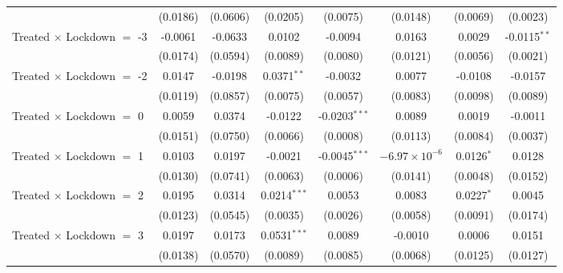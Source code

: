 \begin{tabular}{lccccccc}
                                     & (0.0186)      & (0.0606)      & (0.0205)        & (0.0075)        & (0.0148)               & (0.0069)      & (0.0023)\\   
   Treated $\times$ Lockdown $=$ -3  & -0.0061       & -0.0633       & 0.0102          & -0.0094         & 0.0163                 & 0.0029        & -0.0115$^{**}$\\   
                                     & (0.0174)      & (0.0594)      & (0.0089)        & (0.0080)        & (0.0121)               & (0.0056)      & (0.0021)\\   
   Treated $\times$ Lockdown $=$ -2  & 0.0147        & -0.0198       & 0.0371$^{**}$   & -0.0032         & 0.0077                 & -0.0108       & -0.0157\\   
                                     & (0.0119)      & (0.0857)      & (0.0075)        & (0.0057)        & (0.0083)               & (0.0098)      & (0.0089)\\   
   Treated $\times$ Lockdown $=$ 0   & 0.0059        & 0.0374        & -0.0122         & -0.0203$^{***}$ & 0.0089                 & 0.0019        & -0.0011\\   
                                     & (0.0151)      & (0.0750)      & (0.0066)        & (0.0008)        & (0.0113)               & (0.0084)      & (0.0037)\\   
   Treated $\times$ Lockdown $=$ 1   & 0.0103        & 0.0197        & -0.0021         & -0.0045$^{***}$ & $-6.97\times 10^{-6}$  & 0.0126$^{*}$  & 0.0128\\   
                                     & (0.0130)      & (0.0741)      & (0.0063)        & (0.0006)        & (0.0141)               & (0.0048)      & (0.0152)\\   
   Treated $\times$ Lockdown $=$ 2   & 0.0195        & 0.0314        & 0.0214$^{***}$  & 0.0053          & 0.0083                 & 0.0227$^{*}$  & 0.0045\\   
                                     & (0.0123)      & (0.0545)      & (0.0035)        & (0.0026)        & (0.0058)               & (0.0091)      & (0.0174)\\   
   Treated $\times$ Lockdown $=$ 3   & 0.0197        & 0.0173        & 0.0531$^{***}$  & 0.0089          & -0.0010                & 0.0006        & 0.0151\\   
                                     & (0.0138)      & (0.0570)      & (0.0089)        & (0.0085)        & (0.0068)               & (0.0125)      & (0.0127)\\   

\end{tabular}
